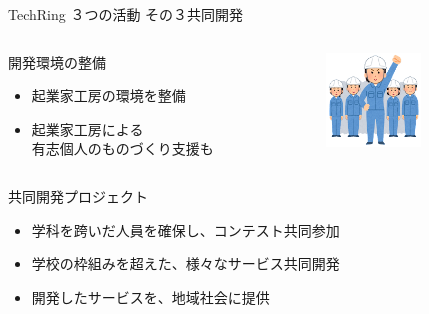 \documentclass[dvipdfmx]{beamer}
\begin{document}
\begin{frame}{TechRing ３つの活動 その３}{共同開発}
  \begin{columns}
    \begin{column}{0.63\textwidth}
      \begin{block}{開発環境の整備}
        \begin{itemize}
          \item 起業家工房の環境を整備
          \item 起業家工房による\\有志個人のものづくり支援も
        \end{itemize}
      \end{block}
    \end{column}

    \begin{column}{0.28\textwidth}
      \begin{center}
        \includegraphics[width=2.5cm]{pic/Team.png}
      \end{center}
    \end{column}
  \end{columns}

  \begin{alertblock}{共同開発プロジェクト}
    \begin{itemize}
      \item 学科を跨いだ人員を確保し、コンテスト共同参加
      \item 学校の枠組みを超えた、様々なサービス共同開発
      \item 開発したサービスを、地域社会に提供
    \end{itemize}
  \end{alertblock}
\end{frame}
\end{document}
